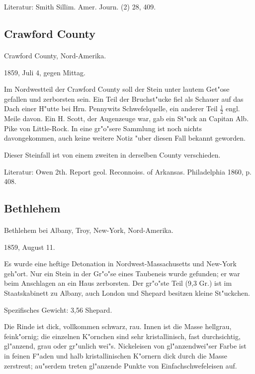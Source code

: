 \documentclass[a4paper, 11pt, oneside]{article}
\begin{document}
\footnotesize
Literatur: Smith Sillim. Amer. Journ. (2) 28, 409.

\subsection{Crawford County}
\normalsize
\paragraph{}
Crawford County, Nord-Amerika.

1859, Juli 4, gegen Mittag.

Im Nordwestteil der Crawford County soll der Stein unter lautem Get"ose gefallen und zerborsten sein. Ein Teil der Bruchst"ucke fiel als Schauer auf das Dach einer H"utte bei Hrn. Pennywits Schwefelquelle, ein anderer Teil $\frac{1}{2}$ engl. Meile davon. Ein H. Scott, der Augenzeuge war, gab ein St"uck an Capitan Alb. Pike von Little-Rock. In eine gr"o"sere Sammlung ist noch nichts davongekommen, auch keine weitere Notiz "uber diesen Fall bekannt geworden.

Dieser Steinfall ist von einem zweiten in derselben County verschieden.

\footnotesize
Literatur: Owen 2th. Report geol. Reconnoiss. of Arkansas. Philadelphia 1860, p. 408.

\subsection{Bethlehem}
\normalsize
\paragraph{}
Bethlehem bei Albany, Troy, New-York, Nord-Amerika.

1859, August 11.

Es wurde eine heftige Detonation in Nordwest-Massachusetts und New-York geh"ort. Nur ein Stein in der Gr"o"se eines Taubeneis wurde gefunden; er war beim Anschlagen an ein Haus zerborsten. Der gr"o"ste Teil (9,3 Gr.) ist im Staatskabinett zu Albany, auch London und Shepard besitzen kleine St"uckchen.

Spezifisches Gewicht: 3,56 Shepard.

Die Rinde ist dick, vollkommen schwarz, rau. Innen ist die Masse hellgrau, feink"ornig; die einzelnen K"ornchen sind sehr kristallinisch, fast durchsichtig, gl"anzend, grau oder gr"unlich wei"s. Nickeleisen von gl"anzendwei"ser Farbe ist in feinen F"aden und halb kristallinischen K"ornern dick durch die Masse zerstreut; au"serdem treten gl"anzende Punkte von Einfachschwefeleisen auf.
\end{document}
